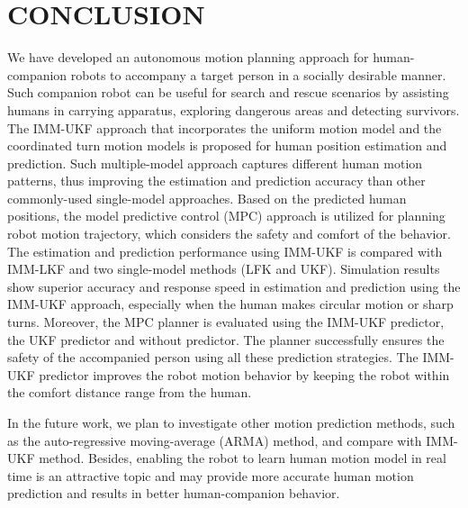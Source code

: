 \documentclass[letterpaper, 10 pt, conference]{ieeeconf}
\begin{document}
	\section{CONCLUSION}\label{sec:conclusion}
	We have developed an autonomous motion planning approach for human-companion robots to accompany a target person in a socially desirable manner.
	Such companion robot can be useful for search and rescue scenarios by assisting humans in carrying apparatus, exploring dangerous areas and detecting survivors.
	The IMM-UKF approach that incorporates the uniform motion model and the coordinated turn motion models is proposed for human position estimation and prediction.
	Such multiple-model approach captures different human motion patterns, thus improving the estimation and prediction accuracy than other commonly-used single-model approaches.
	Based on the predicted human positions, the model predictive control (MPC) approach is utilized for planning robot motion trajectory, which considers the safety and comfort of the behavior.
	The estimation and prediction performance using IMM-UKF is compared with IMM-LKF and two single-model methods (LFK and UKF).
	Simulation results show superior accuracy and response speed in estimation and prediction using the IMM-UKF approach, especially when the human makes circular motion or sharp turns.
	Moreover, the MPC planner is evaluated using the IMM-UKF predictor, the UKF predictor and without predictor.
	The planner successfully ensures the safety of the accompanied person using all these prediction strategies.
	The IMM-UKF predictor improves the robot motion behavior by keeping the robot within the comfort distance range from the human.
	
	In the future work, we plan to investigate other motion prediction methods, such as the auto-regressive moving-average (ARMA) method, and compare with IMM-UKF method.
	Besides,  enabling the robot to learn human motion model in real time is an attractive topic and may provide more accurate human motion prediction and results in better human-companion behavior.
	
	
\end{document}
